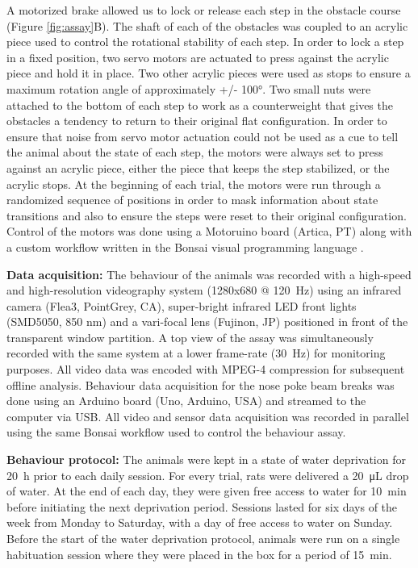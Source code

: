 A motorized brake allowed us to lock or release each step in the obstacle course (Figure \ref{fig:assay}B). The shaft of each of the obstacles was coupled to an acrylic piece used to control the rotational stability of each step. In order to lock a step in a fixed position, two servo motors are actuated to press against the acrylic piece and hold it in place. Two other acrylic pieces were used as stops to ensure a maximum rotation angle of approximately +/- \ang{100}. Two small nuts were attached to the bottom of each step to work as a counterweight that gives the obstacles a tendency to return to their original flat configuration. In order to ensure that noise from servo motor actuation could not be used as a cue to tell the animal about the state of each step, the motors were always set to press against an acrylic piece, either the piece that keeps the step stabilized, or the acrylic stops. At the beginning of each trial, the motors were run through a randomized sequence of positions in order to mask information about state transitions and also to ensure the steps were reset to their original configuration. Control of the motors was done using a Motoruino board (Artica, PT) along with a custom workflow written in the Bonsai visual programming language \cite{Lopes2015a}.

\textbf{Data acquisition:} The behaviour of the animals was recorded with a high-speed and high-resolution videography system (1280x680 @ \SI{120}{\hertz}) using an infrared camera (Flea3, PointGrey, CA), super-bright infrared LED front lights (SMD5050, 850 nm) and a vari-focal lens (Fujinon, JP) positioned in front of the transparent window partition. A top view of the assay was simultaneously recorded with the same system at a lower frame-rate (\SI{30}{\hertz}) for monitoring purposes. All video data was encoded with MPEG-4 compression for subsequent offline analysis. Behaviour data acquisition for the nose poke beam breaks was done using an Arduino board (Uno, Arduino, USA) and streamed to the computer via USB. All video and sensor data acquisition was recorded in parallel using the same Bonsai workflow used to control the behaviour assay.

\textbf{Behaviour protocol:} The animals were kept in a state of water deprivation for \SI{20}{\hour} prior to each daily session. For every trial, rats were delivered a \SI{20}{\micro\liter} drop of water. At the end of each day, they were given free access to water for \SI{10}{\minute} before initiating the next deprivation period. Sessions lasted for six days of the week from Monday to Saturday, with a day of free access to water on Sunday. Before the start of the water deprivation protocol, animals were run on a single habituation session where they were placed in the box for a period of \SI{15}{\minute}.


